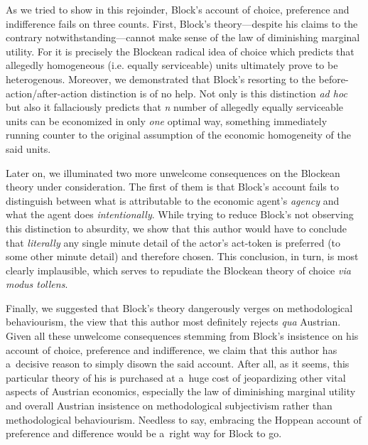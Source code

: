 As we tried to show in this rejoinder, Block's account of choice, preference and indifference fails on three counts. First, Block's theory---despite his claims to the contrary notwithstanding---cannot make sense of the law of diminishing marginal utility. For it is precisely the Blockean radical idea of choice which predicts that allegedly homogeneous (i.e. equally serviceable) units ultimately prove to be heterogenous. Moreover, we demonstrated that Block's resorting to the before-action/after-action distinction is of no help. Not only is this distinction \textit{ad hoc} but also it fallaciously predicts that \textit{n} number of allegedly equally serviceable units can be economized in only \textit{one} optimal way, something immediately running counter to the original assumption of the economic homogeneity of the said units.



Later on, we illuminated two more unwelcome consequences on the Blockean theory under consideration. The first of them is that Block's 
\parencite*[][]{block_response_2022} %
 account fails to distinguish between what is attributable to the economic agent's \textit{agency} and what the agent does \textit{intentionally}. While trying to reduce Block's not observing this distinction to absurdity, we show that this author would have to conclude that \textit{literally} any single minute detail of the actor's act-token is preferred (to some other minute detail) and therefore chosen. This conclusion, in turn, is most clearly implausible, which serves to repudiate the Blockean theory of choice \textit{via modus tollens}.



Finally, we suggested that Block's theory dangerously verges on methodological behaviourism, the view that this author most definitely rejects \textit{qua} Austrian. Given all these unwelcome consequences stemming from Block's insistence on his account of choice, preference and indifference, we claim that this author has a~decisive reason to simply disown the said account. After all, as it seems, this particular theory of his is purchased at a~huge cost of jeopardizing other vital aspects of Austrian economics, especially the law of diminishing marginal utility and overall Austrian insistence on methodological subjectivism rather than methodological behaviourism. Needless to say, embracing the Hoppean 
\parencite*[][]{hoppe_must_2005} %
 account of preference and difference would be a~right way for Block to go.



